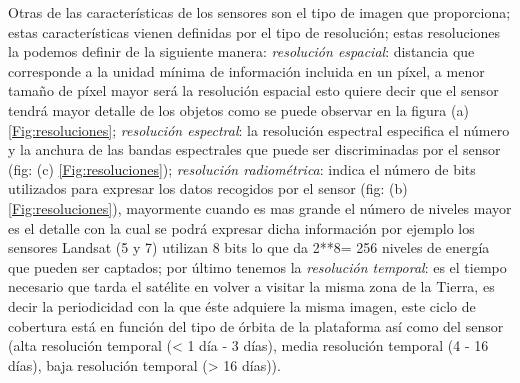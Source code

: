 Otras de las características de los sensores son el tipo de imagen que proporciona; estas características vienen definidas por el tipo de resolución; estas resoluciones la podemos definir de la siguiente manera: \textit{resolución espacial}: distancia que corresponde a la unidad mínima de información incluida en un píxel, a menor tamaño de píxel mayor será la resolución espacial esto quiere decir que el sensor tendrá mayor detalle de los objetos como se puede observar en la figura (a) \ref{Fig:resoluciones};  
\textit{resolución espectral}: la resolución espectral especifica el número y la anchura de las bandas espectrales que puede ser discriminadas por el sensor (fig: (c) \ref{Fig:resoluciones}); \textit{resolución radiométrica}: indica el número de bits utilizados para expresar los datos recogidos por el sensor (fig: (b) \ref{Fig:resoluciones}), mayormente cuando es mas grande el número de niveles mayor es el detalle con la cual se podrá expresar dicha información por ejemplo los sensores Landsat (5 y 7) utilizan 8 bits lo que da 2**8= 256 niveles de energía que pueden ser captados; por último tenemos la \textit{resolución temporal}: es el tiempo necesario que tarda el satélite en volver a visitar la misma zona de la Tierra, es decir la periodicidad con la que éste adquiere la misma imagen, este ciclo de cobertura está en función del tipo de órbita de la plataforma así como del sensor (alta resolución temporal (< 1 día - 3 días), media resolución temporal (4 - 16 días), baja resolución temporal (> 16 días)).


